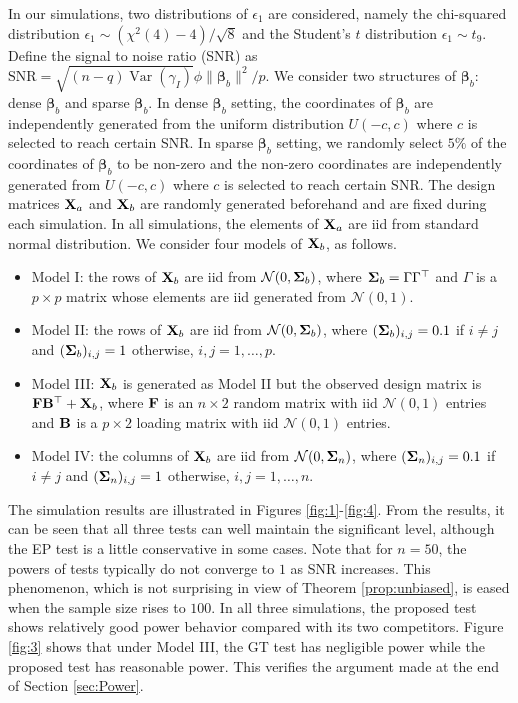 \documentclass[smallextended]{svjour3}       %
\DeclareMathOperator{\myVar}{Var}
\newcommand{\bfsym}[1]{\ensuremath{\boldsymbol{#1}}}
\def\bbeta{\bfsym \beta}
\begin{document}
In our simulations, two distributions of $\epsilon_1$ are considered, namely the chi-squared distribution \mbox{$\epsilon_1 \sim (\chi^2(4)-4)/\sqrt 8$} and the Student's $t$ distribution $\epsilon_1 \sim t_9$.
Define the signal to noise ratio (SNR) as $\text{SNR}=\sqrt{(n-q)\myVar (\gamma_I)} \phi \|\bbeta_b\|^2/p$.
We consider two structures of $\bbeta_b$: dense $\bbeta_b$ and sparse $\bbeta_b$.
In dense $\bbeta_b$ setting, the coordinates of $\bbeta_b$ are independently generated from the uniform distribution $U(-c, c)$ where $c$ is selected to reach certain SNR.
In sparse $\bbeta_b$ setting, we randomly select $5\%$ of the coordinates of $\bbeta_b$ to be non-zero and the non-zero coordinates are independently generated from $U(-c,c)$ where $c$ is selected to reach certain SNR.
The design matrices $\mathbf{X}_a$ and $\mathbf{X}_b$ are randomly generated beforehand and are fixed during each simulation.
In all simulations, the elements of $\mathbf{X}_a$ are iid from standard normal distribution.
We consider four models of $\mathbf{X}_b$, as follows.
\begin{itemize}
    \item Model I: the rows of $\mathbf{X}_b$ are iid from $\mathcal N(0,\bSigma_b)$, where $\bSigma_b =\Gamma \Gamma^\top$ and $\Gamma$ is a $p\times p$ matrix whose elements are iid generated from $\mathcal N(0,1)$.
        \item
            Model II: the rows of $\mathbf{X}_b$ are iid from $\mathcal N(0,\bSigma_b)$, where $(\bSigma_b)_{i,j}=0.1$ if $i\neq j$ and $(\bSigma_b)_{i,j}=1$ otherwise, $i,j=1,\dots,p$.
        \item
            Model III: $\mathbf{X}_b$ is generated as Model II but the observed design matrix is $\mathbf{F}\mathbf{B}^\top+\mathbf{X}_b$, where $\mathbf{F}$ is an $n \times 2$ random matrix with iid $\mathcal N(0,1)$ entries and $\mathbf{B}$ is a $p \times 2$ loading matrix with iid $\mathcal N(0,1)$ entries.
        \item
            Model IV: the columns of $\mathbf{X}_b$ are iid from $\mathcal N(0, \bSigma_n)$, where $(\bSigma_n)_{i,j}=0.1$ if $i\neq j$ and $(\bSigma_n)_{i,j}=1$ otherwise, $i,j=1,\dots,n$.
\end{itemize}
The simulation results are illustrated in Figures \ref{fig:1}-\ref{fig:4}.
From the results, it can be seen that all three tests can well maintain the significant level, although the EP test is a little conservative in some cases.
Note that for $n =50$, the powers of tests typically do not converge to $1$ as SNR increases.
This phenomenon, which is not surprising in view of Theorem \ref{prop:unbiased}, is eased when the sample size rises to $100$.
In all three simulations, the proposed test shows relatively good power behavior compared with its two competitors.
Figure \ref{fig:3} shows that under Model III, the GT test has negligible power while the proposed test has reasonable power.
This verifies the argument made at the end of Section \ref{sec:Power}.
\end{document}
